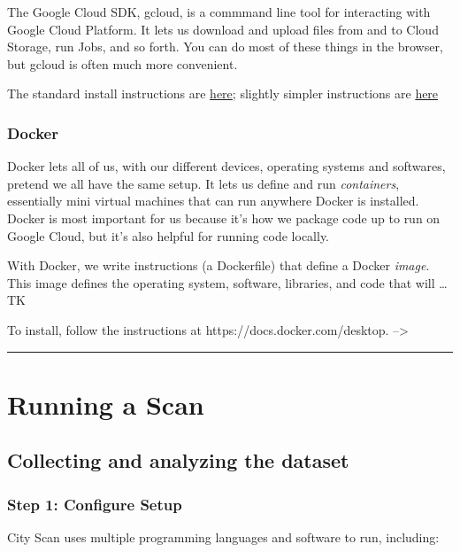 \documentclass[
  letterpaper,
  DIV=11,
  numbers=noendperiod]{scrreprt}
\begin{document}
The Google Cloud SDK, gcloud, is a commmand line tool for interacting
with Google Cloud Platform. It lets us download and upload files from
and to Cloud Storage, run Jobs, and so forth. You can do most of these
things in the browser, but gcloud is often much more convenient.

The standard install instructions are
\href{https://cloud.google.com/sdk/docs/install}{here}; slightly simpler
instructions are
\href{https://cloud.google.com/sdk/docs/downloads-interactive}{here}

\subsection{Docker}\label{docker}

Docker lets all of us, with our different devices, operating systems and
softwares, pretend we all have the same setup. It lets us define and run
\emph{containers}, essentially mini virtual machines that can run
anywhere Docker is installed. Docker is most important for us because
it's how we package code up to run on Google Cloud, but it's also
helpful for running code locally.

With Docker, we write instructions (a Dockerfile) that define a Docker
\emph{image}. This image defines the operating system, software,
libraries, and code that will \ldots{} TK

To install, follow the instructions at https://docs.docker.com/desktop.
--\textgreater{}

\begin{center}\rule{0.5\linewidth}{0.5pt}\end{center}

\chapter{Running a Scan}\label{running-a-scan}

\section{Collecting and analyzing the
dataset}\label{collecting-and-analyzing-the-dataset}

\subsection{Step 1: Configure Setup}\label{step-1-configure-setup}

City Scan uses multiple programming languages and software to run,
including:
\end{document}
